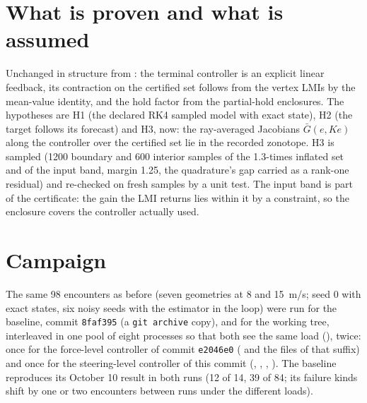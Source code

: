 \documentclass[11pt]{article}
\begin{document}
\section{What is proven and what is assumed}
Unchanged in structure from :
the terminal controller is an explicit linear feedback, its contraction on
the certified set follows from the vertex LMIs by the mean-value identity,
and the hold factor from the partial-hold enclosures. The hypotheses are H1
(the declared RK4 sampled model with exact state), H2 (the target follows its
forecast) and H3, now: the ray-averaged Jacobians $\bar G(e,Ke)$ along the
controller over the certified set lie in the recorded zonotope. H3 is
sampled (1200 boundary and 600 interior samples of the 1.3-times inflated set
and of the input band, margin 1.25, the quadrature's gap carried as a
rank-one residual) and re-checked on fresh samples by a unit test. The input
band is part of the certificate: the gain the LMI returns lies within it by
a constraint, so the enclosure covers the controller actually used.

\section{Campaign}
\label{sec:campaign}
The same 98 encounters as before (seven geometries at 8 and 15~m/s; seed 0
with exact states, six noisy seeds with the estimator in the loop) were run
for the baseline, commit \texttt{8faf395} (a \texttt{git archive} copy), and
for the working tree, interleaved in one pool of eight processes so that both
see the same load (), twice: once for the
force-level controller of commit \texttt{e2046e0}
( and the files of that suffix) and once
for the steering-level controller of this commit (,
, , ).
The baseline reproduces its October 10 result in both runs (12 of 14, 39 of
84; its failure kinds shift by one or two encounters between runs under the
different loads).
\end{document}
